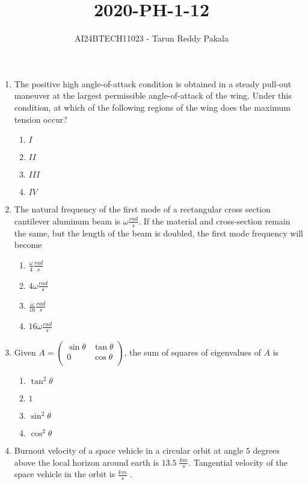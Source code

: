 \documentclass[journal,12pt,onecolumn]{IEEEtran}
\title{2020-PH-1-12}
\author{AI24BTECH11023 - Tarun Reddy Pakala}
\theoremstyle{remark}
\begin{document}


\maketitle
\bigskip
\renewcommand{\thefigure}{\theenumi}
\renewcommand{\thetable}{\theenumi}
\begin{enumerate}
\item The positive high angle-of-attack condition is obtained in a steady pull-out maneuver at the largest permissible angle-of-attack of the wing. Under this condition, at which of the following regions of the wing does the maximum tension occur?

\begin{enumerate}
    \item $I$
    \item $II$
    \item $III$
    \item $IV$
\end{enumerate}
\item The natural frequency of the first mode of a rectangular cross section cantilever aluminum beam is $\omega \frac{rad}{s}$. If the material and cross-section remain the same, but the length of the beam is doubled, the first mode frequency will become
\begin{enumerate}
    \item $\frac{\omega}{4}\frac{rad}{s}$
    \item $4\omega \frac{rad}{s}$
    \item $\frac{\omega}{16} \frac{rad}{s}$
    \item $16\omega \frac{rad}{s}$
\end{enumerate}
\item Given $A=\begin{pmatrix}
    \sin \theta & \tan \theta \\
    0 & \cos \theta \\
\end{pmatrix}$, the sum of squares of eigenvalues of $A$ is
\begin{enumerate}
    \item $\tan^2\theta$
    \item $1$
    \item $\sin^2\theta$
    \item $\cos^2\theta$
\end{enumerate}
\item Burnout velocity of a space vehicle in a circular orbit at angle $5$ degrees above the local horizon around earth is $13.5\;\frac{km}{s}$. Tangential velocity of the space vehicle in the orbit is \underline{\hspace{2cm}} $\frac{km}{s}$ .

\end{enumerate}
\end{document}
